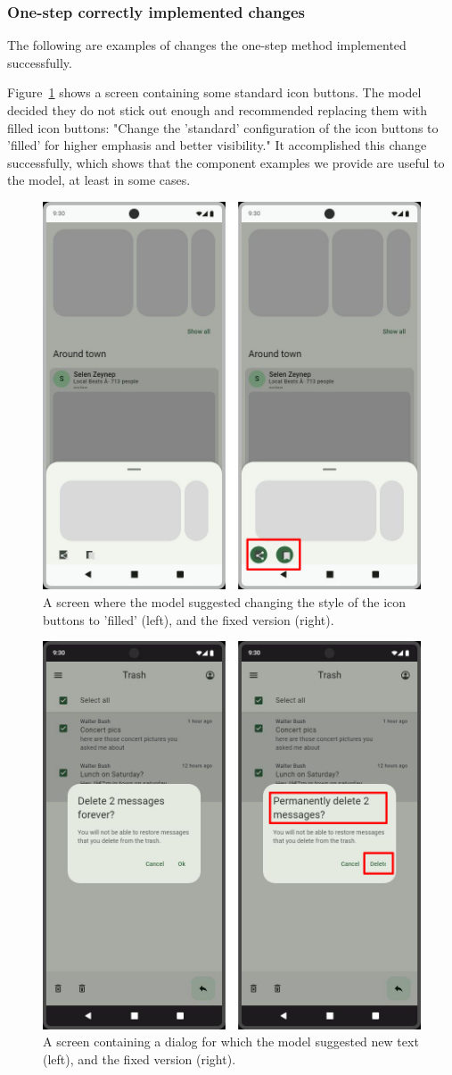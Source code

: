 \documentclass[11pt,titlepage,oneside,openany]{book}
\begin{document}
\subsubsection{One-step correctly implemented changes}

The following are examples of changes the one-step method implemented successfully.

Figure~\ref{fig:change_good_ex_os_1} shows a screen containing some standard icon buttons. The model decided they do not stick out enough and recommended replacing them with filled icon buttons: "Change the 'standard' configuration of the icon buttons to 'filled' for higher emphasis and better visibility." It accomplished this change successfully, which shows that the component examples we provide are useful to the model, at least in some cases.

\begin{figure}[H]
	\centering
	\includegraphics[width=.58\textwidth]{figures/change_good_ex_os_1.jpg}
	\caption{A screen where the model suggested changing the style of the icon buttons to 'filled' (left), and the fixed version (right).}
	\label{fig:change_good_ex_os_1}
\end{figure}

\begin{figure}[H]
	\centering
	\includegraphics[width=.58\textwidth]{figures/change_good_ex_os_2.jpg}
	\caption{A screen containing a dialog for which the model suggested new text (left), and the fixed version (right).}
	\label{fig:change_good_ex_os_2}
\end{figure}
\end{document}
